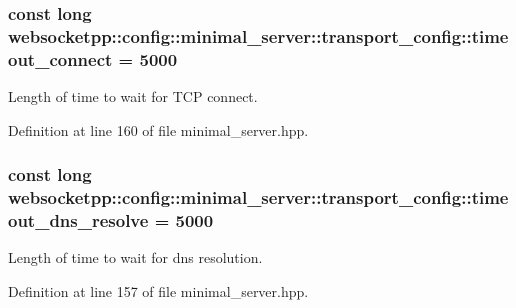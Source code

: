 \subsubsection[{timeout\+\_\+connect}]{\setlength{\rightskip}{0pt plus 5cm}const long websocketpp\+::config\+::minimal\+\_\+server\+::transport\+\_\+config\+::timeout\+\_\+connect = 5000\hspace{0.3cm}{\ttfamily [static]}}\label{structwebsocketpp_1_1config_1_1minimal__server_1_1transport__config_addfe5947be3138e84b1773b5be2ad49c}


Length of time to wait for T\+C\+P connect. 



Definition at line 160 of file minimal\+\_\+server.\+hpp.

\hypertarget{structwebsocketpp_1_1config_1_1minimal__server_1_1transport__config_a0f5cb2ea153d5f06b02b183364f7b11e}{}
\subsubsection[{timeout\+\_\+dns\+\_\+resolve}]{\setlength{\rightskip}{0pt plus 5cm}const long websocketpp\+::config\+::minimal\+\_\+server\+::transport\+\_\+config\+::timeout\+\_\+dns\+\_\+resolve = 5000\hspace{0.3cm}{\ttfamily [static]}}\label{structwebsocketpp_1_1config_1_1minimal__server_1_1transport__config_a0f5cb2ea153d5f06b02b183364f7b11e}


Length of time to wait for dns resolution. 



Definition at line 157 of file minimal\+\_\+server.\+hpp.

\hypertarget{structwebsocketpp_1_1config_1_1minimal__server_1_1transport__config_a1082d008bb545885253eaff90fcd58f6}{}
